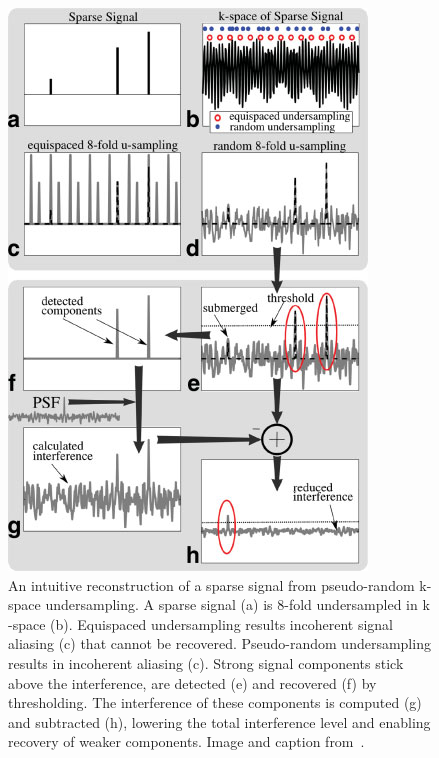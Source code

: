 \begin{figure}
    \centering
    \includegraphics[width=\linewidth]{images/project with Wiem/fig-001.png}
    \caption{An intuitive reconstruction of a sparse signal from pseudo-random k-space undersampling. A sparse signal (a) is 8-fold undersampled in k -space (b). Equispaced undersampling results incoherent signal aliasing (c) that cannot be recovered. Pseudo-random undersampling results in incoherent aliasing (c). Strong signal components stick above the interference, are detected (e) and recovered (f) by thresholding. The interference of these components is computed (g) and subtracted (h), lowering the total interference level and enabling recovery of weaker components. Image and caption from~\cite{sparse}.}
    \label{fig:incoherence}
\end{figure}

